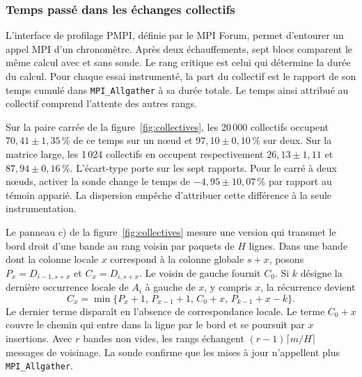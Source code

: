 
\subsubsection{Temps passé dans les échanges collectifs}\label{sec:collectives}
L'interface de profilage PMPI, définie par le MPI Forum, permet d'entourer un appel MPI d'un chronomètre. Après deux échauffements, sept blocs comparent le même calcul avec et sans sonde. Le rang critique est celui qui détermine la durée du calcul. Pour chaque essai instrumenté, la part du collectif est le rapport de son temps cumulé dans \texttt{MPI\_Allgather} à sa durée totale. Le temps ainsi attribué au collectif comprend l'attente des autres rangs.

Sur la paire carrée de la figure~\ref{fig:collectives}, les 20\,000 collectifs occupent \(70{,}41\pm1{,}35\)\,\% de ce temps sur un nœud et \(97{,}10\pm0{,}10\)\,\% sur deux. Sur la matrice large, les 1\,024 collectifs en occupent respectivement \(26{,}13\pm1{,}11\) et \(87{,}94\pm0{,}16\)\,\%. L'écart-type porte sur les sept rapports. Pour le carré à deux nœuds, activer la sonde change le temps de \(-4{,}95\pm10{,}07\)\,\% par rapport au témoin apparié. La dispersion empêche d'attribuer cette différence à la seule instrumentation.

Le panneau c) de la figure~\ref{fig:collectives} mesure une version qui transmet le bord droit d'une bande au rang voisin par paquets de \(H\) lignes. Dans une bande dont la colonne locale \(x\) correspond à la colonne globale \(s+x\), posons \(P_x=D_{i-1,s+x}\) et \(C_x=D_{i,s+x}\). Le voisin de gauche fournit \(C_0\). Si \(k\) désigne la dernière occurrence locale de \(A_i\) à gauche de \(x\), y compris \(x\), la récurrence devient
\[
 C_x=\min\bigl\{P_x+1,\,P_{x-1}+1,\,C_0+x,\,P_{k-1}+x-k\bigr\}.
\]
Le dernier terme disparaît en l'absence de correspondance locale. Le terme \(C_0+x\) couvre le chemin qui entre dans la ligne par le bord et se poursuit par \(x\) insertions. Avec \(r\) bandes non vides, les rangs échangent \((r-1)\lceil m/H\rceil\) messages de voisinage. La sonde confirme que les mises à jour n'appellent plus \texttt{MPI\_Allgather}.

